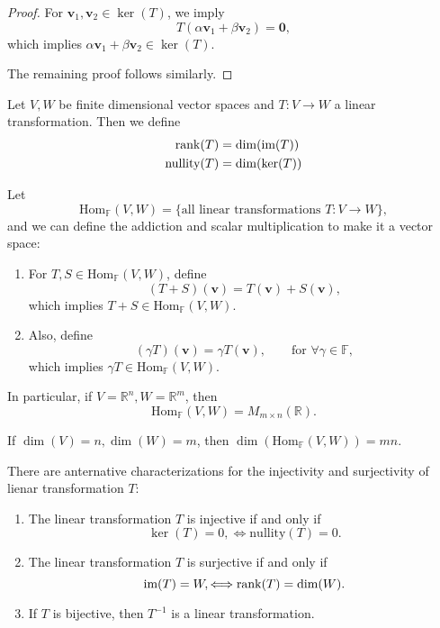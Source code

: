 \begin{proof}
For $\bm v_1,\bm v_2\in\ker(T)$, we imply
\[
T(\alpha\bm v_1+\beta\bm v_2)=\bm0,
\]
which implies $\alpha\bm v_1+\beta\bm v_2\in\ker(T)$.

The remaining proof follows similarly.
\end{proof}

\begin{definition}
Let $V,W$ be finite dimensional vector spaces and 
$T:V\to W$ a linear transformation. 
Then we define
\begin{align*}
\operatorname{rank}(T)&=\dim(\text{im}(T))\\
\text{nullity}(T)&=\dim(\ker(T))
\end{align*}
\end{definition}

\begin{remark}
Let
\[
\text{Hom}_{\mathbb{F}}(V,W)=\{\text{all linear transformations }T:V\to W\},
\]
and we can define the addiction and scalar multiplication to make it a vector space:
\begin{enumerate}
\item
For $T,S\in\text{Hom}_{\mathbb{F}}(V,W)$, define
\[
(T+S)(\bm v)=T(\bm v)+S(\bm v),
\]
which implies $T+S\in\text{Hom}_{\mathbb{F}}(V,W)$.
\item
Also, define
\[
(\gamma T)(\bm v)=\gamma T(\bm v),\qquad
\text{for }\forall\gamma\in\mathbb{F},
\]
which implies $\gamma T\in\text{Hom}_{\mathbb{F}}(V,W)$.
\end{enumerate}
In particular, if $V=\mathbb{R}^n,W=\mathbb{R}^m$, then
\[
\text{Hom}_{\mathbb{F}}(V,W)=M_{m\times n}(\mathbb{R}).
\]
\end{remark}

\begin{proposition}
If $\dim(V)=n,\dim(W)=m$, then $\dim(\text{Hom}_{\mathbb{F}}(V,W))=mn$.
\end{proposition}

\begin{proposition}

There are anternative characterizations for the injectivity and surjectivity of lienar transformation $T$:
\begin{enumerate}
\item
The linear transformation $T$ is injective if and only if
\[
\ker(T)=0,
\Longleftrightarrow
\mbox{nullity}(T)=0.
\]
\item
The linear transformation $T$ is surjective if and only if
\[
\text{im}(T)=W,
\Longleftrightarrow
\operatorname{rank}(T)=\dim(W).
\]
\item
If $T$ is bijective, then $T^{-1}$ is a linear transformation.
\end{enumerate}
\end{proposition}

